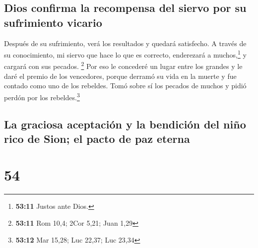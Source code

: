 \hypertarget{dios-confirma-la-recompensa-del-siervo-por-su-sufrimiento-vicario}{%
\subsection{Dios confirma la recompensa del siervo por su sufrimiento
vicario}\label{dios-confirma-la-recompensa-del-siervo-por-su-sufrimiento-vicario}}

 Después de su sufrimiento, verá los resultados y quedará
satisfecho. A través de su conocimiento, mi siervo que hace lo que es
correcto, enderezará a muchos,\footnote{\textbf{53:11} Justos ante Dios.}
y cargará con sus pecados. \footnote{\textbf{53:11} Rom 10,4; 2Cor 5,21;
  Juan 1,29}  Por eso le concederé un lugar entre los
grandes y le daré el premio de los vencedores, porque derramó su vida en
la muerte y fue contado como uno de los rebeldes. Tomó sobre sí los
pecados de muchos y pidió perdón por los rebeldes.\footnote{\textbf{53:12}
  Mar 15,28; Luc 22,37; Luc 23,34}

\hypertarget{la-graciosa-aceptaciuxf3n-y-la-bendiciuxf3n-del-niuxf1o-rico-de-sion-el-pacto-de-paz-eterna}{%
\subsection{La graciosa aceptación y la bendición del niño rico de Sion;
el pacto de paz
eterna}\label{la-graciosa-aceptaciuxf3n-y-la-bendiciuxf3n-del-niuxf1o-rico-de-sion-el-pacto-de-paz-eterna}}

\hypertarget{section-53}{%
\section{54}\label{section-53}}

